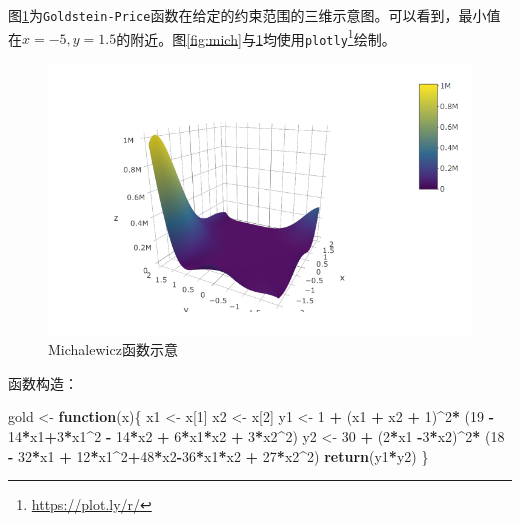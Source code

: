 \documentclass[]{ctexbook}
\newenvironment{Shaded}{\begin{snugshade}}{\end{snugshade}}
\newcommand{\KeywordTok}[1]{\textcolor[rgb]{0.13,0.29,0.53}{\textbf{#1}}}
\newcommand{\DecValTok}[1]{\textcolor[rgb]{0.00,0.00,0.81}{#1}}
\newcommand{\StringTok}[1]{\textcolor[rgb]{0.31,0.60,0.02}{#1}}
\newcommand{\ControlFlowTok}[1]{\textcolor[rgb]{0.13,0.29,0.53}{\textbf{#1}}}
\newcommand{\OperatorTok}[1]{\textcolor[rgb]{0.81,0.36,0.00}{\textbf{#1}}}
\newcommand{\NormalTok}[1]{#1}
\renewcommand{\href}[2]{#2\footnote{\url{#1}}}
\begin{document}
图\ref{fig:gold}为\texttt{Goldstein-Price}函数在给定的约束范围的三维示意图。可以看到，最小值在\(x = -5,y = 1.5\)的附近。图\ref{fig:mich}与\ref{fig:gold}均使用\href{https://plot.ly/r/}{\texttt{plotly}}绘制。

\begin{figure}

{\centering \includegraphics[width=0.8\linewidth]{img/gold} 

}

\caption{ Michalewicz函数示意}\label{fig:gold}
\end{figure}

函数构造：

\begin{Shaded}
\begin{Highlighting}[]
\NormalTok{gold <-}\StringTok{ }\ControlFlowTok{function}\NormalTok{(x)\{}
\NormalTok{  x1 <-}\StringTok{ }\NormalTok{x[}\DecValTok{1}\NormalTok{]}
\NormalTok{  x2 <-}\StringTok{ }\NormalTok{x[}\DecValTok{2}\NormalTok{]}
\NormalTok{  y1 <-}\StringTok{ }\DecValTok{1} \OperatorTok{+}\StringTok{ }\NormalTok{(x1 }\OperatorTok{+}\StringTok{ }\NormalTok{x2 }\OperatorTok{+}\StringTok{ }\DecValTok{1}\NormalTok{)}\OperatorTok{^}\DecValTok{2}\OperatorTok{*}
\StringTok{    }\NormalTok{(}\DecValTok{19} \OperatorTok{-}\StringTok{ }\DecValTok{14}\OperatorTok{*}\NormalTok{x1}\OperatorTok{+}\DecValTok{3}\OperatorTok{*}\NormalTok{x1}\OperatorTok{^}\DecValTok{2} \OperatorTok{-}\StringTok{ }\DecValTok{14}\OperatorTok{*}\NormalTok{x2 }\OperatorTok{+}\StringTok{ }\DecValTok{6}\OperatorTok{*}\NormalTok{x1}\OperatorTok{*}\NormalTok{x2 }\OperatorTok{+}\StringTok{ }\DecValTok{3}\OperatorTok{*}\NormalTok{x2}\OperatorTok{^}\DecValTok{2}\NormalTok{)}
\NormalTok{  y2 <-}\StringTok{ }\DecValTok{30} \OperatorTok{+}\StringTok{ }\NormalTok{(}\DecValTok{2}\OperatorTok{*}\NormalTok{x1 }\OperatorTok{-}\DecValTok{3}\OperatorTok{*}\NormalTok{x2)}\OperatorTok{^}\DecValTok{2}\OperatorTok{*}
\StringTok{    }\NormalTok{(}\DecValTok{18} \OperatorTok{-}\StringTok{ }\DecValTok{32}\OperatorTok{*}\NormalTok{x1 }\OperatorTok{+}\StringTok{ }\DecValTok{12}\OperatorTok{*}\NormalTok{x1}\OperatorTok{^}\DecValTok{2}\OperatorTok{+}\DecValTok{48}\OperatorTok{*}\NormalTok{x2}\OperatorTok{-}\DecValTok{36}\OperatorTok{*}\NormalTok{x1}\OperatorTok{*}\NormalTok{x2 }\OperatorTok{+}\StringTok{ }\DecValTok{27}\OperatorTok{*}\NormalTok{x2}\OperatorTok{^}\DecValTok{2}\NormalTok{)}
  \KeywordTok{return}\NormalTok{(y1}\OperatorTok{*}\NormalTok{y2)}
\NormalTok{\}}
\end{Highlighting}
\end{Shaded}
\end{document}
